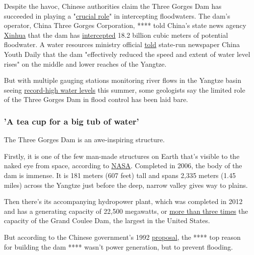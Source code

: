 Despite the havoc, Chinese authorities claim the Three Gorges Dam has
succeeded in playing a
"\href{http://ccnews.people.com.cn/n1/2020/0722/c141677-31792659.html}{crucial
role}" in intercepting floodwaters. The dam's operator, China Three
Gorges Corporation, **** told China's state news agency
\href{http://www.xinhuanet.com/politics/2020-07/24/c_1126282059.htm}{Xinhua}
that the dam has
\href{http://www.gov.cn/xinwen/2020-07/30/content_5531320.htm}{intercepted}
18.2 billion cubic meters of potential floodwater. A water resources
ministry official
\href{http://ccnews.people.com.cn/n1/2020/0722/c141677-31792659.html}{told}
state-run newspaper China Youth Daily that the dam "effectively reduced
the speed and extent of water level rises" on the middle and lower
reaches of the Yangtze.

But with multiple gauging stations monitoring river flows in the Yangtze
basin seeing
\href{http://www.gov.cn/xinwen/2020-07/13/content_5526182.htm}{record-high
water levels} this summer, some geologists say the limited role of the
Three Gorges Dam in flood control has been laid bare.

\hypertarget{a-tea-cup-for-a-big-tub-of-water}{%
\subsubsection{'A tea cup for a big tub of
water'}\label{a-tea-cup-for-a-big-tub-of-water}}

The Three Gorges Dam is an awe-inspiring structure.

Firstly, it is one of the few man-made structures on Earth that's
visible to the naked eye from space, according to
\href{https://svs.gsfc.nasa.gov/3433}{NASA}. Completed in 2006, the body
of the dam is immense. It is 181 meters (607 feet) tall and spans 2,335
meters (1.45 miles) across the Yangtze just before the deep, narrow
valley gives way to plains.

Then there's its accompanying hydropower plant, which was completed in
2012 and has a generating capacity of 22,500 megawatts, or
\href{https://www.usgs.gov/special-topic/water-science-school/science/three-gorges-dam-worlds-largest-hydroelectric-plant?qt-science_center_objects=0\#qt-science_center_objects}{more
than three times} the capacity of the Grand Coulee Dam, the largest in
the United States.

But according to the Chinese government's 1992
\href{http://www.npc.gov.cn/wxzl/gongbao/2000-12/14/content_5002697.htm}{proposal},
the **** top reason for building the dam **** wasn't power generation,
but to prevent flooding.


